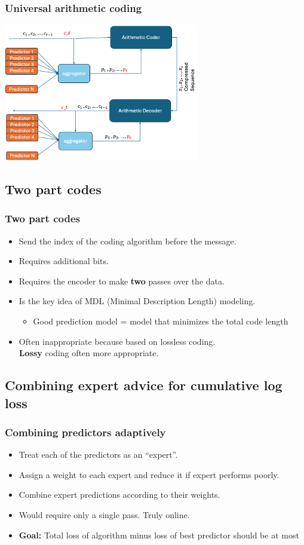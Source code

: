 \documentclass{beamer}
\begin{document}
\begin{frame}
  \frametitle{Universal arithmetic coding}
\includegraphics[height=6cm]{figures/codeDecode/Slide2.png}

\end{frame}

\subsection{Two part codes}

\begin{frame}
\frametitle{Two part codes}
\begin{itemize}
\item Send the index of the coding algorithm before the message.
\item Requires  additional bits.
\item Requires the encoder to make {\bf two} passes over the data.
\item Is the key idea of {\color{blue}MDL} (Minimal Description Length) modeling.
\begin{itemize}
\item Good prediction model = model that minimizes the total code length
\end{itemize}
\item Often inappropriate because based on {\color{blue} lossless} coding. \\
{\bf Lossy} coding often more appropriate.
\end{itemize}
\end{frame}

\subsection{Combining expert advice for cumulative log loss}

\begin{frame}
\frametitle{Combining predictors adaptively}
\begin{itemize}
\item Treat each of the predictors as an ``expert''.
\item Assign a weight to each expert and reduce it if expert performs poorly.
\item Combine expert predictions according to their weights.
\item Would require only a single pass. Truly online.
\item {\bf Goal:} Total loss of algorithm minus loss of best predictor should be at most 
\end{itemize}
\end{frame}
\end{document}
